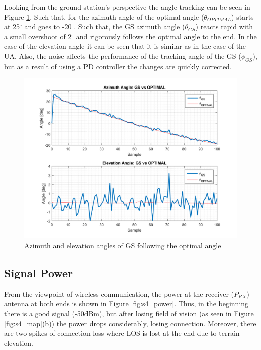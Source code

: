 Looking from the ground station's perspective the angle tracking can be seen in Figure \ref{fig:s4_gs}. Such that, for the azimuth angle of the optimal angle ($\theta_{OPTIMAL}$) starts at 25$^{\circ}$ and goes to -20$^{\circ}$. Such that, the GS azimuth angle ($\theta_{GS}$) reacts rapid with a small overshoot of 2$^{\circ}$ and rigorously follows the optimal angle to the end. In the case of the elevation angle it can be seen that it is similar as in the case of the UA. Also, the noise affects the performance of the tracking angle of the GS ($\phi_{GS}$), but as a result of using a PD controller the changes are quickly corrected.

\begin{figure}[H]
	\centering
	\includegraphics[scale=0.75]{figures/s4_gs.png}
	\caption{Azimuth and elevation angles of GS following the optimal angle}
	\label{fig:s4_gs}
\end{figure}

\subsection*{Signal Power}
From the viewpoint of wireless communication, the power at the receiver ($P_{RX}$) antenna at both ends is shown in Figure \ref{fig:s4_power}. Thus, in the beginning there is a good signal (-50dBm), but after losing field of vision (as seen in Figure \ref{fig:s4_map}(b)) the power drops considerably, losing connection. Moreover, there are two spikes of connection loss where LOS is lost at the end due to terrain elevation.

